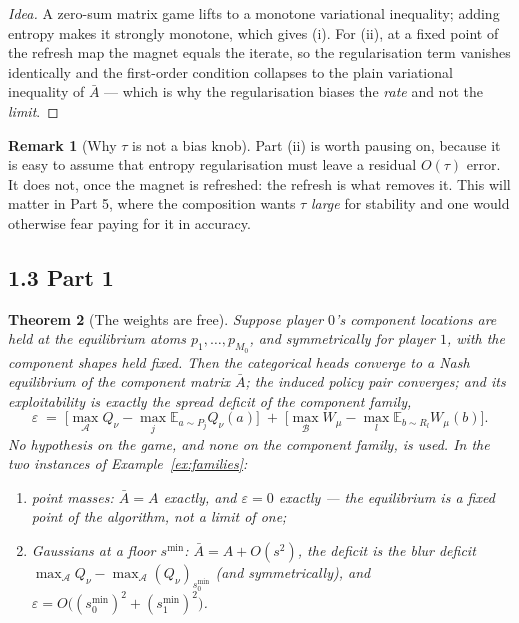 \documentclass[11pt]{article}
\newtheorem{theorem}{Theorem}[section]
\theoremstyle{definition}
\newtheorem{remark}[theorem]{Remark}
\newcommand{\E}{\mathbb{E}}
\newcommand{\cA}{\mathcal{A}}
\newcommand{\cB}{\mathcal{B}}
\begin{document}
\begin{proof}[Idea]
A zero-sum matrix game lifts to a monotone variational inequality; adding
entropy makes it strongly monotone, which gives (i). For (ii), at a fixed point
of the refresh map the magnet equals the iterate, so the regularisation term
vanishes identically and the first-order condition collapses to the plain
variational inequality of $\bar A$ --- which is why the regularisation biases the
\emph{rate} and not the \emph{limit}.
\end{proof}

\begin{remark}[Why $\tau$ is not a bias knob]\label{rem:tau}
Part (ii) is worth pausing on, because it is easy to assume that entropy
regularisation must leave a residual $O(\tau)$ error. It does not, once the magnet
is refreshed: the refresh is what removes it. This will matter in Part 5, where
the composition wants $\tau$ \emph{large} for stability and one would otherwise
fear paying for it in accuracy.
\end{remark}

\subsection*{1.3 Part 1}

\begin{theorem}[The weights are free]\label{thm:part1}
Suppose player $0$'s component locations are held at the equilibrium atoms
$p_1,\dots,p_{M_0}$, and symmetrically for player $1$, with the component shapes
held fixed. Then the categorical heads converge to a Nash equilibrium of the
component matrix $\bar A$; the induced policy pair converges; and its
exploitability is exactly the \emph{spread deficit} of the component family,
\[
  \varepsilon \;=\; \Big[\max_\cA Q_\nu - \max_j \E_{a\sim P_j} Q_\nu(a)\Big]
  \;+\; \Big[\max_\cB W_\mu - \max_l \E_{b\sim R_l} W_\mu(b)\Big] .
\]
\emph{No hypothesis on the game, and none on the component family, is used.}
In the two instances of Example~\ref{ex:families}:
\begin{enumerate}
\item[(i)] \emph{point masses}: $\bar A = A$ exactly, and $\varepsilon = 0$
  exactly --- the equilibrium is a fixed point of the algorithm, not a limit of
  one;
\item[(ii)] \emph{Gaussians at a floor $s^{\min}$}: $\bar A = A + O(s^2)$, the
  deficit is the blur deficit $\max_\cA Q_\nu - \max_\cA (Q_\nu)_{s^{\min}_0}$
  (and symmetrically), and
  $\varepsilon = O\big((s^{\min}_0)^2 + (s^{\min}_1)^2\big)$.
\end{enumerate}
\end{theorem}
\end{document}
